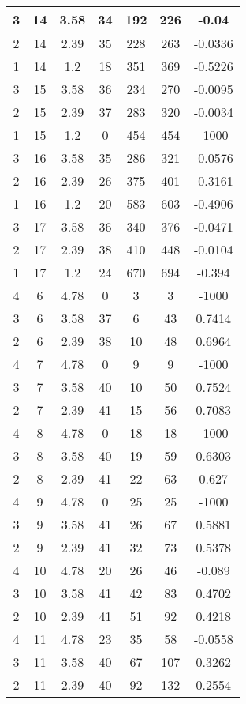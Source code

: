 \documentclass[letterpaper, 12pt]{article}
\begin{document}
\begin{longtable}{|c|c|c|c|c|c|c|}
\hline
3 & 14 & 3.58 & 34 & 192 & 226 & -0.04 \\
\hline
2 & 14 & 2.39 & 35 & 228 & 263 & -0.0336 \\
\hline
1 & 14 & 1.2 & 18 & 351 & 369 & -0.5226 \\
\hline
3 & 15 & 3.58 & 36 & 234 & 270 & -0.0095 \\
\hline
2 & 15 & 2.39 & 37 & 283 & 320 & -0.0034 \\
\hline
1 & 15 & 1.2 & 0 & 454 & 454 & -1000 \\
\hline
3 & 16 & 3.58 & 35 & 286 & 321 & -0.0576 \\
\hline
2 & 16 & 2.39 & 26 & 375 & 401 & -0.3161 \\
\hline
1 & 16 & 1.2 & 20 & 583 & 603 & -0.4906 \\
\hline
3 & 17 & 3.58 & 36 & 340 & 376 & -0.0471 \\
\hline
2 & 17 & 2.39 & 38 & 410 & 448 & -0.0104 \\
\hline
1 & 17 & 1.2 & 24 & 670 & 694 & -0.394 \\
\hline
4 & 6 & 4.78 & 0 & 3 & 3 & -1000 \\
\hline
3 & 6 & 3.58 & 37 & 6 & 43 & 0.7414 \\
\hline
2 & 6 & 2.39 & 38 & 10 & 48 & 0.6964 \\
\hline
4 & 7 & 4.78 & 0 & 9 & 9 & -1000 \\
\hline
3 & 7 & 3.58 & 40 & 10 & 50 & 0.7524 \\
\hline
2 & 7 & 2.39 & 41 & 15 & 56 & 0.7083 \\
\hline
4 & 8 & 4.78 & 0 & 18 & 18 & -1000 \\
\hline
3 & 8 & 3.58 & 40 & 19 & 59 & 0.6303 \\
\hline
2 & 8 & 2.39 & 41 & 22 & 63 & 0.627 \\
\hline
4 & 9 & 4.78 & 0 & 25 & 25 & -1000 \\
\hline
3 & 9 & 3.58 & 41 & 26 & 67 & 0.5881 \\
\hline
2 & 9 & 2.39 & 41 & 32 & 73 & 0.5378 \\
\hline
4 & 10 & 4.78 & 20 & 26 & 46 & -0.089 \\
\hline
3 & 10 & 3.58 & 41 & 42 & 83 & 0.4702 \\
\hline
2 & 10 & 2.39 & 41 & 51 & 92 & 0.4218 \\
\hline
4 & 11 & 4.78 & 23 & 35 & 58 & -0.0558 \\
\hline
3 & 11 & 3.58 & 40 & 67 & 107 & 0.3262 \\
\hline
2 & 11 & 2.39 & 40 & 92 & 132 & 0.2554 \\

\end{longtable}
\end{document}
